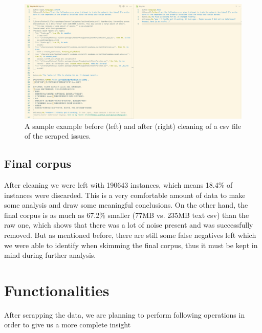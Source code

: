 \documentclass[]{article}
\begin{document}
\begin{figure}[H]
    \centering
    \includegraphics[width=1\textwidth]{cleaning-example.png}
    \caption{A sample example before (left) and after (right) cleaning of a csv file of the scraped issues.}
    \label{fig:cleaning-example}
\end{figure}

\subsection{Final corpus}

After cleaning we were left with 190643 instances, which means 18.4\% of instances were discarded. This is a very comfortable amount of data to make some analysis and draw some meaningful conclusions. On the other hand, the final corpus is as much as 67.2\% smaller (77MB vs. 235MB text csv) than the raw one, which shows that there was a lot of noise present and was successfully removed. But as mentioned before, there are still some false negatives left which we were able to identify when skimming the final corpus, thus it must be kept in mind during further analysis.

\section{Functionalities}

After scrapping the data, we are planning to perform following operations in order to give us a more complete insight
\end{document}
